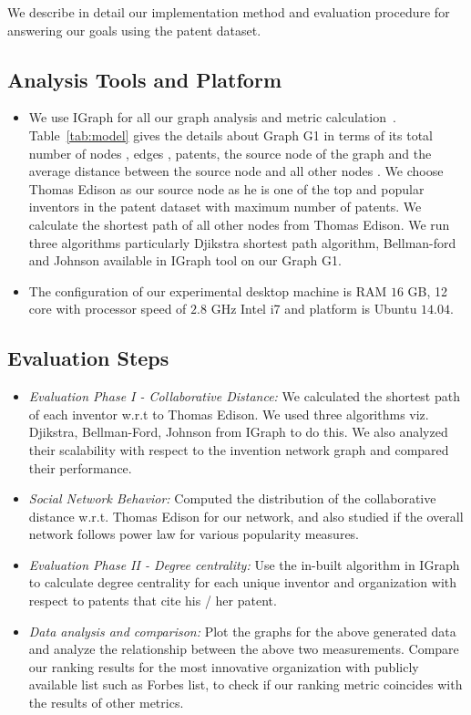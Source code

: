 We describe in detail our implementation method and evaluation procedure for
answering  our goals using the patent dataset. 

\subsection{Analysis Tools and Platform}


	\begin{itemize}
		\squish
		\item We use IGraph for all our graph analysis and metric
		calculation~\cite{gephi, igraph}. Table~\ref{tab:model} gives the details
		about Graph G1 in terms of its total number of nodes , edges , patents, the
		source node  of the graph and the average distance between the source node and
		all other nodes .    We choose Thomas Edison as our source node as he is one
		of the top and popular inventors in the patent dataset with maximum number of
		patents. We calculate the shortest path of all other nodes from Thomas Edison.
		We run three algorithms particularly Djikstra shortest path algorithm,
		Bellman-ford and Johnson available in IGraph tool on our Graph G1.
		\item The configuration of our experimental desktop machine is RAM $16$ GB, 12
		core with processor speed of $2.8$ GHz Intel i7 and platform is Ubuntu
		$14.04$.
	\end{itemize}

\subsection{Evaluation Steps}
	\begin{itemize}
		\squish
		\item {\em Evaluation Phase I - Collaborative Distance:} We calculated the 
		shortest path of each inventor w.r.t to Thomas Edison. We used three
		algorithms viz. Djikstra, Bellman-Ford, Johnson from IGraph to do this. We
		also analyzed their scalability with respect to the invention network graph
		and compared their performance.
		\item {\em Social Network Behavior:} Computed the distribution of the 
		collaborative distance w.r.t. Thomas Edison for our network, and also studied
		if the overall network follows power law for various popularity measures.
		\item {\em Evaluation Phase II - Degree centrality:} Use the in-built
		algorithm in IGraph to calculate degree centrality
		for each unique inventor and organization with respect to patents that cite his / her patent.
		\item {\em Data analysis and comparison:} Plot the graphs for the above
		generated data and analyze the relationship between the above two
		measurements. Compare our ranking results for the most innovative organization
		with publicly available list such as Forbes list, to check if our ranking
		metric coincides with the results of other metrics.
	\end{itemize}

